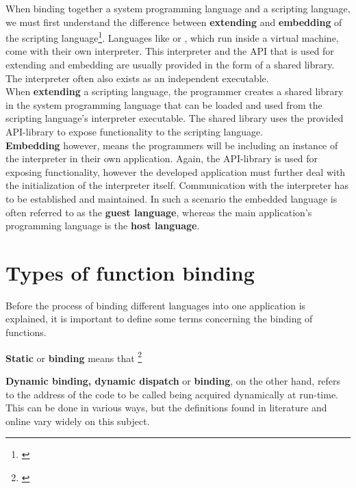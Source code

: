 When binding together a system programming language and a scripting language, we must first understand the difference between \textbf{extending} and \textbf{embedding} of the scripting language\footnote{\citep{PythonHP}}. Languages like  or , which run inside a virtual machine, come with their own interpreter. This interpreter and the API that is used for extending and embedding are usually provided in the form of a shared library. The interpreter often also exists as an independent executable. \\
When \textbf{extending} a scripting language, the programmer creates a shared library in the system programming language that can be loaded and used from the scripting language's interpreter executable. The shared library uses the provided API-library to expose functionality to the scripting language.\\
\textbf{Embedding} however, means the programmers will be including an instance of the interpreter in their own application. Again, the API-library is used for exposing functionality, however the developed application must further deal with the initialization of the interpreter itself. Communication with the interpreter has to be established and maintained. In such a scenario the embedded language is often referred to as the \textbf{guest language}, whereas the main application's programming language is the \textbf{host language}.

\section{Types of function binding}
\label{sec:TypesOfFunctionBinding}

Before the process of binding different languages into one application is explained, it is important to define some terms concerning the binding of functions.

\textbf{Static} or \textbf{ binding} means that \footnote{\citep[41]{ThinkingInCPP}}

\textbf{Dynamic binding, dynamic dispatch} or \textbf{ binding}, on the other hand, refers to the address of the code to be called being acquired dynamically at run-time. This can be done in various ways, but the definitions found in literature and online vary widely on this subject.

